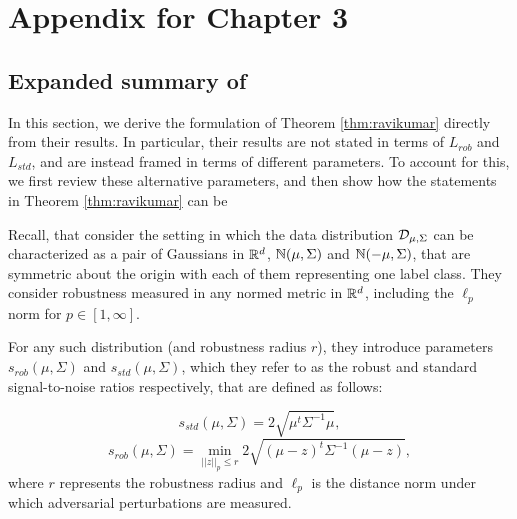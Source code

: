 \graphicspath{{./chapters/chapter2/}}
\newcommand\numeq[1]%
  {\stackrel{\scriptscriptstyle(\mkern-1.5mu#1\mkern-1.5mu)}{=}}
 \newcommand\numgeq[1]%
  {\stackrel{\scriptscriptstyle(\mkern-1.5mu#1\mkern-1.5mu)}{\geq}}
\chapter{Appendix for Chapter 3}

\section{Expanded summary of \cite{ravikumar20}}\label{sec:appendix_comparison}

In this section, we derive the formulation of Theorem \ref{thm:ravikumar} directly from their results. In particular, their results are not stated in terms of $L_{rob}$ and $L_{std}$, and are instead framed in terms of different parameters. To account for this, we first review these alternative parameters, and then show how the statements in Theorem \ref{thm:ravikumar} can be 

Recall, that \cite{ravikumar20} consider the setting in which the data distribution ${\mathcal D}_{\mu, \Sigma}$ can be characterized as a pair of Gaussians in $\mathbb R^d$, $\mathbb{N}(\mu, \Sigma)$ and $\mathbb{N}(-\mu, \Sigma)$, that are symmetric about the origin with each of them representing one label class. They consider robustness measured in any normed metric in $\mathbb R^d$, including the $\ell_p$ norm for $p \in [1, \infty]$. 

For any such distribution (and robustness radius $r$), they introduce parameters $s_{rob}(\mu, \Sigma)$ and $s_{std}(\mu, \Sigma)$, which they refer to as the robust and standard signal-to-noise ratios respectively, that are defined as follows:

$$s_{std}(\mu, \Sigma) = 2\sqrt{\mu^t\Sigma^{-1}\mu},$$ $$s_{rob}(\mu, \Sigma) = \min_{||z||_p \leq r} 2\sqrt{(\mu - z)^t\Sigma^{-1}(\mu - z)},$$ where $r$ represents the robustness radius and $\ell_p$ is the distance norm under which adversarial perturbations are measured. 

